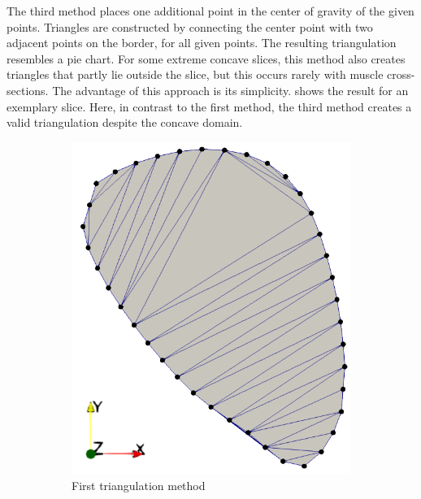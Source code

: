The third method places one additional point in the center of gravity of the given points. Triangles are constructed by connecting the center point with two adjacent points on the border, for all given points. The resulting triangulation resembles a pie chart. For some extreme concave slices, this method also creates triangles that partly lie outside the slice, but this occurs rarely with muscle cross-sections. The advantage of this approach is its simplicity.
 shows the result for an exemplary slice. Here, in contrast to the first method, the third method creates a valid triangulation despite the concave domain.

\begin{figure}%
  \centering%
  \begin{subfigure}[t]{0.31\textwidth}%
    \centering%
    \includegraphics[width=\textwidth]{images/fiber_creation/triangulation_0.png}%
    \caption{First triangulation method}%
    \label{fig:triangulation_0}%
  \end{subfigure}
  \quad
  \begin{subfigure}[t]{0.31\textwidth}%
    \centering%

\end{subfigure}
\end{figure}
